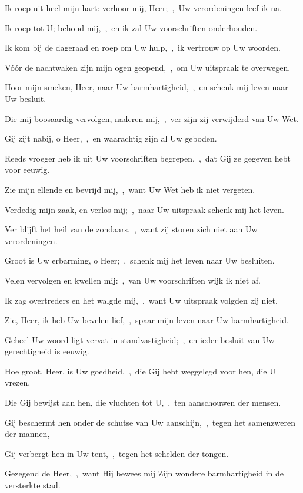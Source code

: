 \documentclass[12pt,twoside,a5paper]{article}
\begin{document}

\begin{halfparskip}
  Ik roep uit heel mijn hart: verhoor mij, Heer;~\sep\ Uw verordeningen leef ik na.


  Ik roep tot U; behoud mij,~\sep\ en ik zal Uw voorschriften onderhouden.

  Ik kom bij de dageraad en roep om Uw hulp,~\sep\ ik vertrouw op Uw woorden.

  Vóór de nachtwaken zijn mijn ogen geopend,~\sep\ om Uw uitspraak te overwegen.

  Hoor mijn smeken, Heer, naar Uw barmhartigheid,~\sep\ en schenk mij leven naar Uw besluit.

  Die mij boosaardig vervolgen, naderen mij,~\sep\ ver zijn zij verwijderd van Uw Wet.

  Gij zijt nabij, o Heer,~\sep\ en waarachtig zijn al Uw geboden.

  Reeds vroeger heb ik uit Uw voorschriften begrepen,~\sep\ dat Gij ze gegeven hebt voor eeuwig.

  Zie mijn ellende en bevrijd mij,~\sep\ want Uw Wet heb ik niet vergeten.

  Verdedig mijn zaak, en verlos mij;~\sep\ naar Uw uitspraak schenk mij het leven.

  Ver blijft het heil van de zondaars,~\sep\ want zij storen zich niet aan Uw verordeningen.

  Groot is Uw erbarming, o Heer;~\sep\ schenk mij het leven naar Uw besluiten.

  Velen vervolgen en kwellen mij:~\sep\ van Uw voorschriften wijk ik niet af.

  Ik zag overtreders en het walgde mij,~\sep\ want Uw uitspraak volgden zij niet.

  Zie, Heer, ik heb Uw bevelen lief,~\sep\ spaar mijn leven naar Uw barmhartigheid.

  Geheel Uw woord ligt vervat in standvastigheid;~\sep\ en ieder besluit van Uw gerechtigheid is eeuwig.
\end{halfparskip}


\begin{halfparskip}
  Hoe groot, Heer, is Uw goedheid,~\sep\ die Gij hebt weggelegd voor hen, die U vrezen,


  Die Gij bewijst aan hen, die vluchten tot U,~\sep\ ten aanschouwen der mensen.

  Gij beschermt hen onder de schutse van Uw aanschijn,~\sep\ tegen het samenzweren der mannen,

  Gij verbergt hen in Uw tent,~\sep\ tegen het schelden der tongen.

  Gezegend de Heer,~\sep\ want Hij bewees mij Zijn wondere barmhartigheid in de versterkte stad.
\end{halfparskip}
\end{document}
